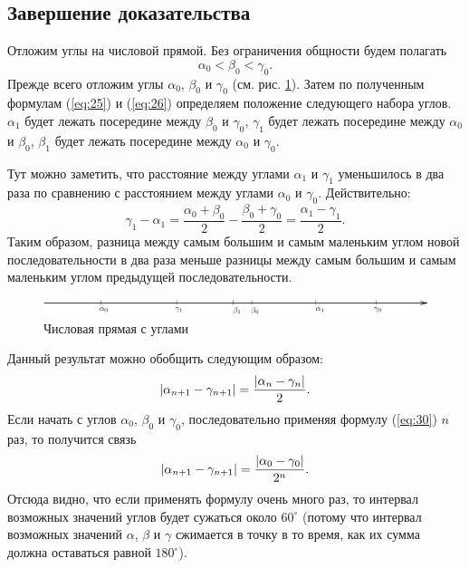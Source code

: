 \documentclass[12pt]{article}
\begin{document}
\subsection{Завершение доказательства}
Отложим углы на числовой прямой. Без ограничения общности будем полагать
\begin{equation}
	\alpha_0 < \beta_0 < \gamma_0.
\end{equation}
Прежде всего отложим углы $\alpha_0$, $\beta_0$ и $\gamma_0$ (см. рис. \ref{fig:8}). Затем по полученным формулам (\ref{eq:25}) и (\ref{eq:26}) определяем положение следующего набора углов. $\alpha_1$ будет лежать посередине между $\beta_0$ и $\gamma_0$, $\gamma_1$ будет лежать посередине между $\alpha_0$ и $\beta_0$, $\beta_1$ будет лежать посередине между $\alpha_0$ и $\gamma_0$.
\par
Тут можно заметить, что расстояние между углами $\alpha_1$ и $\gamma_1$ уменьшилось в два раза по сравнению с расстоянием между углами $\alpha_0$ и $\gamma_0$. Действительно:
\begin{equation}
	\gamma_1 - \alpha_1 = \dfrac{\alpha_0 + \beta_0}{2} - \dfrac{\beta_0 + \gamma_0}{2} = \dfrac{\alpha_1- \gamma_1 }{2}.
\end{equation}
Таким образом, разница между самым большим и самым маленьким углом новой последовательности в два раза меньше разницы между самым большим и самым маленьким углом предыдущей последовательности.
\begin{figure}[!ht]
	\centering
	\includegraphics[width=\textwidth]{first7.pdf}
	\caption{Числовая прямая с углами}
	\label{fig:8}
\end{figure}
\par
Данный результат можно обобщить следующим образом:
\begin{equation}\label{eq:30}
	\abs{\alpha_{n+1} - \gamma_{n+1}} = \dfrac{\abs{\alpha_{n} - \gamma_{n}}}{2}.
\end{equation}
Если начать с углов $\alpha_0$, $\beta_0$ и $\gamma_0$, последовательно применяя формулу (\ref{eq:30}) $n$ раз, то получится связь
\begin{equation}
	\abs{\alpha_{n+1} - \gamma_{n+1}} = \dfrac{\abs{\alpha_{0} - \gamma_{0}}}{2^n}.
\end{equation}
Отсюда видно, что если применять формулу очень много раз, то интервал возможных значений углов будет сужаться около $60^{\circ}$ (потому что интервал возможных значений $\alpha$, $\beta$ и $\gamma$ сжимается в точку в то время, как их сумма должна оставаться равной $180^{\circ}$).
\end{document}

